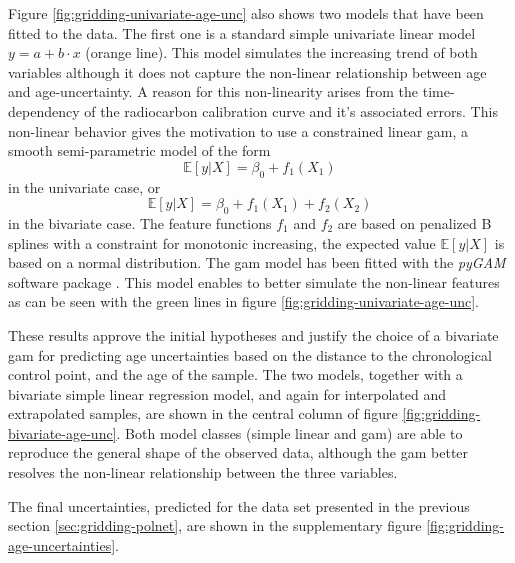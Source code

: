 \begin{refsection}
Figure \ref{fig:gridding-univariate-age-unc} also shows two models that have been fitted to the data. The first one is a standard simple univariate linear model $y = a + b\cdot x$ (orange line). This model simulates the increasing trend of both variables although it does not capture the non-linear relationship between age and age-uncertainty. A reason for this non-linearity arises from the time-dependency of the radiocarbon calibration curve and it's associated errors. This non-linear behavior gives the motivation to use a constrained linear \gls{gam}, a smooth semi-parametric model of the form
%
\begin{equation*}
	\mathbb{E}[y|X] = \beta_0+f_1(X_1)
\end{equation*}
%
in the univariate case, or
%
\begin{equation*}
\mathbb{E}[y|X] = \beta_0+f_1(X_1)+f_2(X_2)
\end{equation*}
%
in the bivariate case. The feature functions $f_1$ and $f_2$ are based on penalized B splines with a constraint for monotonic increasing, the expected value $\mathbb{E}[y|X]$ is based on a normal distribution. The \gls{gam} model has been fitted with the \textit{pyGAM} software package \citep{ServenBrummittAbedi2018}. This model enables to better simulate the non-linear features as can be seen with the green lines in figure \ref{fig:gridding-univariate-age-unc}.

These results approve the initial hypotheses and justify the choice of a bivariate \gls{gam} for predicting age uncertainties based on the distance to the chronological control point, and the age of the sample. The two models, together with a bivariate simple linear regression model, and again for interpolated and extrapolated samples, are shown in the central column of figure \ref{fig:gridding-bivariate-age-unc}. Both model classes (simple linear and \gls{gam}) are able to reproduce the general shape of the observed data, although the \gls{gam} better resolves the non-linear relationship between the three variables.

The final uncertainties, predicted for the data set presented in the previous section \ref{sec:gridding-polnet}, are shown in the supplementary figure \ref{fig:gridding-age-uncertainties}.


\end{refsection}
